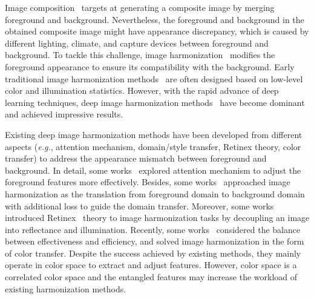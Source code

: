 \documentclass[sigconf]{acmart}
\begin{document}
Image composition~\cite{niu2021making} targets at generating a composite image by merging foreground and background. Nevertheless, the foreground and background in the obtained composite image might have appearance discrepancy, which is caused by different lighting, climate, and capture devices between foreground and background. To tackle this challenge, image harmonization~\cite{sunkavalli2010multi, xue2012understanding, dovenet, issam, CDTNet} modifies the foreground appearance to ensure its compatibility with the background.
Early traditional image harmonization methods~\cite{sunkavalli2010multi, xue2012understanding, song2020illumination, lalonde2007using} are often designed based on low-level color and illumination statistics. However, with the rapid advance of deep learning techniques, deep image harmonization methods~\cite{dovenet, issam, CDTNet, harmonizer} have become dominant and achieved impressive results.

Existing deep image harmonization methods have been developed from different aspects (\emph{e.g.}, attention mechanism, domain/style transfer, Retinex theory, color transfer) to address the appearance mismatch between foreground and background.
In detail, some works~\cite{ssam, feature_mod} explored attention mechanism to adjust the foreground features more effectively. 
Besides, some works~\cite{dovenet, bargainnet} approached image harmonization as the translation from foreground domain to background domain with additional loss to guide the domain transfer.
Moreover, some works~\cite{intrinsic, IHT} introduced Retinex~\cite{land1971lightness} theory to image harmonization tasks by decoupling an image into reflectance and illumination. 
Recently, some works~\cite{harmonizer, CDTNet} considered the balance between effectiveness and efficiency, and solved image harmonization in the form of color transfer.
Despite the success achieved by existing methods, they mainly operate in  color space to extract and adjust features.
However,   color space is a correlated color space and the entangled  features may increase the workload of existing harmonization methods.
\end{document}
